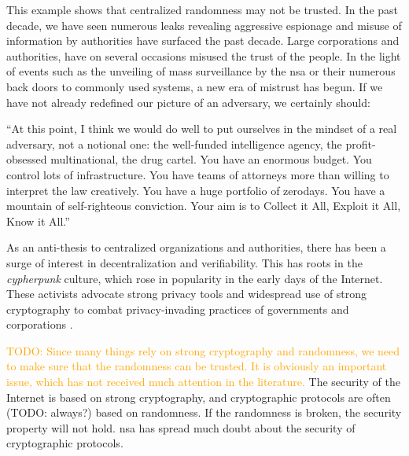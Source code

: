 This example shows that centralized randomness may not be trusted. In the past decade, we have seen numerous leaks revealing aggressive espionage and misuse of information by authorities have surfaced the past decade.
Large corporations and authorities, have on several occasions misused the trust of the people.
In the light of events such as the unveiling of mass surveillance by the \gls{nsa} or their numerous back doors to commonly used systems, a new era of mistrust has begun. If we have not already redefined our picture of an adversary, we certainly should:

\begin{displayquote}
    \enquote{At this point, I think we would do well to put ourselves in the mindset of a real adversary, not a notional one:
    the well-funded intelligence agency, the profit-obsessed multinational, the drug cartel.
    You have an enormous budget. You control lots of infrastructure.
    You have teams of attorneys more than willing to interpret the law creatively.
    You have a huge portfolio of zerodays. You have a mountain of self-righteous conviction.
    Your aim is to Collect it All, Exploit it All, Know it All.}
\end{displayquote}

As an anti-thesis to centralized organizations and authorities, there has been a surge of interest in decentralization and verifiability. This has roots in the \emph{cypherpunk} culture, which rose in popularity in the early days of the Internet.
These activists advocate strong privacy tools and widespread use of strong cryptography to combat privacy-invading practices of governments and corporations .

\textcolor{orange}{TODO: Since many things rely on strong cryptography and randomness, we need to make sure that the randomness can be trusted. It is obviously an important issue, which has not received much attention in the literature.}
The security of the Internet is based on strong cryptography, and cryptographic protocols are often (TODO: always?) based on randomness.
If the randomness is broken, the security property will not hold. \gls{nsa} has spread much doubt about the security of cryptographic protocols.


